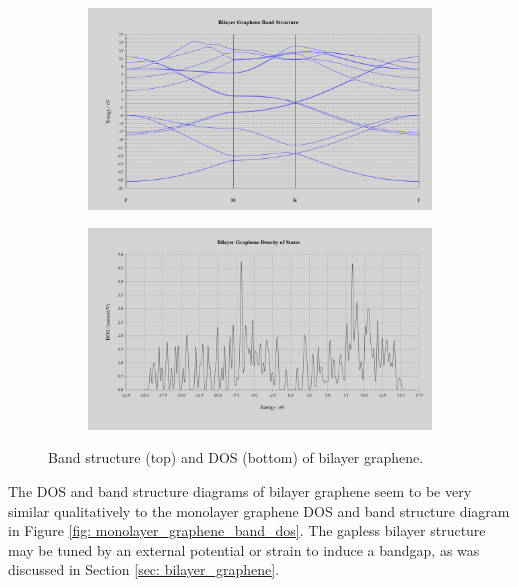 \documentclass[]{article}
\begin{document}
\begin{figure}[H]
	\centering
	\begin{subfigure}[b]{\textwidth}
		\includegraphics[width = \textwidth]{bilayer_graphene_band.PNG}
		\label{fig: bilayer_graphene_band}
	\end{subfigure}
	\hfill
	\begin{subfigure}[b]{\textwidth}
		\includegraphics[width = \textwidth]{bilayer_graphene_dos.PNG}
		\label{fig: bilayer_graphene_dos}
	\end{subfigure}
	\caption{Band structure (top) and DOS (bottom) of bilayer graphene. }
	\label{fig: bilayer_graphene_band_dos}
\end{figure}

The DOS and band structure diagrams of bilayer graphene seem to be very similar qualitatively to the monolayer graphene DOS and band structure diagram in Figure \ref{fig: monolayer_graphene_band_dos}. The gapless bilayer structure may be tuned by an external potential or strain to induce a bandgap, as was discussed in Section \ref{sec: bilayer_graphene}.
\end{document}
